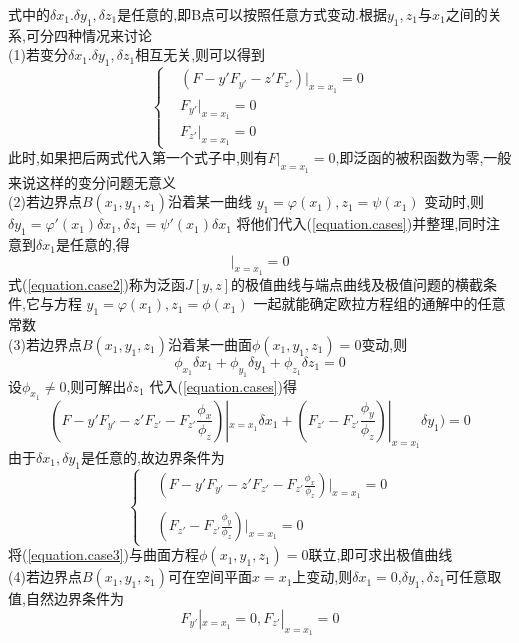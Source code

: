 \documentclass{article}
\begin{document}
式中的$\delta x_1.\delta y_1,\delta z_1$是任意的,即B点可以按照任意方式变动.根据$y_1,z_1与x_1$之间的关系,可分四种情况来讨论
\\
(1)若变分$\delta x_1.\delta y_1,\delta z_1$相互无关,则可以得到
$$
\left\{
  \begin{array}{ll}
     & (F - y'F_{y'} - z'F_{z'})|_{x=x_1}=0 \\
     &  F_{y'}|_{x=x_1}=0\\
     & F_{z'}|_{x=x_1}=0
  \end{array}
\right.
$$
此时,如果把后两式代入第一个式子中,则有$F|_{x=x_1}=0$,即泛函的被积函数为零,一般来说这样的变分问题无意义
\\
(2)若边界点$B(x_1,y_1,z_1)$沿着某一曲线
$y_1=\varphi(x_1),z_1=\psi(x_1)$
变动时,则
$\delta y_1=\varphi'(x_1)\delta x_1,\delta z_1=\psi'(x_1)\delta x_1$
将他们代入(\ref{equation.cases})并整理,同时注意到$\delta x_1$是任意的,得
\begin{equation}
 [F + (\varphi' - y')F_{y'} + (\psi' -z')F_{z'}]|_{x=x_1}=0
\label{equation.case2}
\end{equation}
式(\ref{equation.case2})称为泛函$J[y,z]$的极值曲线与端点曲线及极值问题的横截条件,它与方程
$y_1=\varphi(x_1),z_1=\phi(x_1)$
一起就能确定欧拉方程组的通解中的任意常数
\\
(3)若边界点$B(x_1,y_1,z_1)$沿着某一曲面$\phi(x_1,y_1,z_1)=0$变动,则
\begin{equation}
 \phi_{x_1}\delta x_1+
 \phi_{y_1}\delta y_1+
 \phi_{z_1}\delta z_1=0
\end{equation}
设$\phi_{x_1}\neq 0$,则可解出$\delta z_1$
代入(\ref{equation.cases})得
\begin{equation}
(F - y'F_{y'} - z'F_{z'} - F_{z'}\frac{\phi_x}{\phi_z})|_{x=x_1} \delta x_1 +
(F_{z'} -F_{z'}\frac{\phi_y}{\phi_z})|_{x=x_1} \delta y_1  )
=0
\end{equation}
由于$\delta x_1,\delta y_1$是任意的,故边界条件为
\begin{equation}
\left\{
  \begin{array}{lll}
     & (F - y'F_{y'} - z'F_{z'} - F_{z'}\frac{\phi_x}{\phi_z})|_{x=x_1} =0 \\
&\\
    & (F_{z'} -F_{z'}\frac{\phi_y}{\phi_z})|_{x=x_1} =0
  \end{array}
\right.
\label{equation.case3}
\end{equation}
将(\ref{equation.case3})与曲面方程$\phi(x_1,y_1,z_1)=0$联立,即可求出极值曲线
\\
(4)若边界点$B(x_1,y_1,z_1)$可在空间平面$x=x_1$上变动,则$\delta x_1=0$,$\delta y_1,\delta z_1$可任意取值,自然边界条件为
\begin{equation}
F_{y'}|_{x=x_1}=0,
F_{z'}|_{x=x_1}=0
\end{equation}
\end{document}
